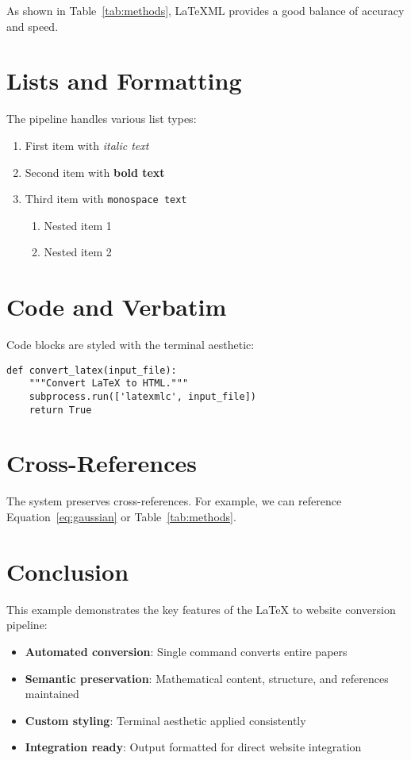 \documentclass{article}
\begin{document}
As shown in Table~\ref{tab:methods}, LaTeXML provides a good balance of accuracy and speed.

\section{Lists and Formatting}

The pipeline handles various list types:

\begin{enumerate}
    \item First item with \textit{italic text}
    \item Second item with \textbf{bold text}
    \item Third item with \texttt{monospace text}
    \begin{enumerate}
        \item Nested item 1
        \item Nested item 2
    \end{enumerate}
\end{enumerate}

\section{Code and Verbatim}

Code blocks are styled with the terminal aesthetic:

\begin{verbatim}
def convert_latex(input_file):
    """Convert LaTeX to HTML."""
    subprocess.run(['latexmlc', input_file])
    return True
\end{verbatim}

\section{Cross-References}

The system preserves cross-references. For example, we can reference Equation~\ref{eq:gaussian} or Table~\ref{tab:methods}.

\section{Conclusion}

This example demonstrates the key features of the LaTeX to website conversion pipeline:

\begin{itemize}
    \item \textbf{Automated conversion}: Single command converts entire papers
    \item \textbf{Semantic preservation}: Mathematical content, structure, and references maintained
    \item \textbf{Custom styling}: Terminal aesthetic applied consistently
    \item \textbf{Integration ready}: Output formatted for direct website integration
\end{itemize}
\end{document}

